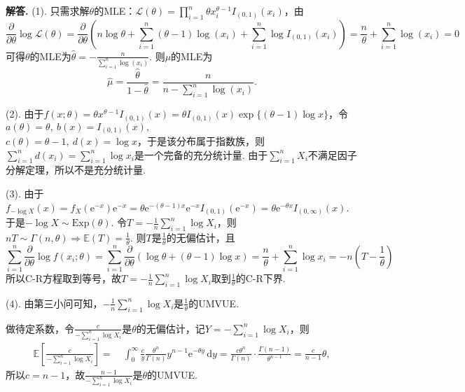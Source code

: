 \documentclass[12pt, a4paper, oneside]{ctexart}
\newenvironment{solution}[1][]{\par\noindent\textbf{#1解答. }}{\smallskip\par}  %
\def\E{\mathbb{E}}          %
\def\d{\mathrm{d}}          %
\def\e{\mathrm{e}}          %
\def\L{\mathcal{L}}         %
\def\add{\vspace{1ex}}      %
\begin{document}
\begin{solution}
    (1). 只需求解$\theta$的MLE：$\L(\theta) = \prod_{i=1}^n\theta x_i^{\theta-1}I_{(0,1)}(x_i)$，由
    \begin{equation*}
        \frac{\partial}{\partial \theta}\log\L(\theta) = \frac{\partial}{\partial \theta}\left(n\log\theta+\sum_{i=1}^n(\theta-1)\log(x_i)+\sum_{i=1}^n\log I_{(0,1)}(x_i)\right) = \frac{n}{\theta}+\sum_{i=1}^n\log(x_i) = 0
    \end{equation*}
    可得$\theta$的MLE为$\hat{\theta} = -\frac{n}{\sum_{i=1}^n\log(x_i)}$. 则$\mu$的MLE为
    \begin{equation*}
        \hat{\mu} = \frac{\hat{\theta}}{1-\hat{\theta}} = \frac{n}{n-\sum_{i=1}^n\log(x_i)}.
    \end{equation*}
    
    (2). 由于$f(x;\theta) = \theta x^{\theta-1}I_{(0,1)}(x) = \theta I_{(0,1)}(x)\exp\{(\theta-1)\log x\}$，令$a(\theta) = \theta,\ b(x)  = I_{(0,1)}(x),$\\$c(\theta) = \theta-1,\ d(x) = \log x$，于是该分布属于指数族，则$\sum_{i=1}^nd(x_i) = \sum_{i=1}^n\log x_i$是一个完备的充分统计量. 由于$\sum_{i=1}^nX_i$不满足因子分解定理，所以不是充分统计量.

    (3). 由于$f_{-\log X}(x) = f_X(\e^{-x})\e^{-x} = \theta\e^{-(\theta-1)x}\e^{-x}I_{(0,1)}(\e^{-x})=\theta\e^{-\theta x}I_{(0,\infty)}(x)$. \add 于是$-\log X\sim \text{Exp}(\theta)$. 令$T = -\frac{1}{n}\sum_{i=1}^n\log X_i$，则$nT\sim\Gamma(n,\theta) \Rightarrow \E(T) = \frac{1}{\theta}$. 则$T$是$\frac{1}{\theta}$的无偏估计，且
    \begin{equation*}
        \sum_{i=1}^n\frac{\partial}{\partial\theta}\log f(x_i;\theta) = \sum_{i=1}^n\frac{\partial}{\partial\theta}(\log\theta+(\theta-1)\log x)=\frac{n}{\theta}+\sum_{i=1}^n\log x_i= -n\left(T-\frac{1}{\theta}\right)
    \end{equation*}
    所以C-R方程取到等号，故$T=-\frac{1}{n}\sum_{i=1}^n\log X_i$取到$\frac{1}{\theta}$的C-R下界.

    (4). 由第三小问可知，$-\frac{1}{n}\sum_{i=1}^n\log X_i$是$\frac{1}{\theta}$的UMVUE.

    做待定系数，令$\frac{c}{-\sum_{i=1}^n\log X_i}$是$\theta$的无偏估计，记$Y = -\sum_{i=1}^n\log X_i$，则
    \begin{align*}
        \E\left[\frac{c}{-\sum_{i=1}^n\log X_i}\right] =&\ \int_0^\infty\frac{c}{y}\frac{\theta^n}{\Gamma(n)}y^{n-1}\e^{-\theta y}\,\d y
        = \frac{c\theta^n}{\Gamma(n)}\cdot\frac{\Gamma(n-1)}{\theta^{n-1}} = \frac{c}{n-1}\theta,
    \end{align*}
    所以$c = n-1$，故$\frac{n-1}{-\sum_{i=1}^n\log X_i}$是$\theta$的UMVUE.
    

\end{solution}
\end{document}

